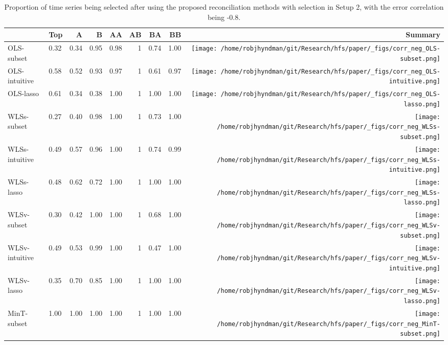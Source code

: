 \documentclass[
  12pt,
  11pt]{article}
\begin{document}
\hypertarget{tbl-corr-selection-neg}{}
\begin{table}[!h]
\caption{\label{tbl-corr-selection-neg}Proportion of time series being selected after using the proposed
reconciliation methods with selection in Setup 2, with the error
correlation being -0.8. }\tabularnewline

\centering\begingroup\fontsize{11}{13}\selectfont

\begin{threeparttable}
\begin{tabular}{llrrrrrr>{}r}
\toprule
  & Top & A & B & AA & AB & BA & BB & Summary\\
\midrule
OLS-subset & 0.32 & 0.34 & 0.95 & 0.98 & 1 & 0.74 & 1.00 & \texttt{[image: /home/robjhyndman/git/Research/hfs/paper/\_figs/corr\_neg\_OLS-subset.png]}\\
OLS-intuitive & 0.58 & 0.52 & 0.93 & 0.97 & 1 & 0.61 & 0.97 & \texttt{[image: /home/robjhyndman/git/Research/hfs/paper/\_figs/corr\_neg\_OLS-intuitive.png]}\\
OLS-lasso & 0.61 & 0.34 & 0.38 & 1.00 & 1 & 1.00 & 1.00 & \texttt{[image: /home/robjhyndman/git/Research/hfs/paper/\_figs/corr\_neg\_OLS-lasso.png]}\\
\midrule
WLSs-subset & 0.27 & 0.40 & 0.98 & 1.00 & 1 & 0.73 & 1.00 & \texttt{[image: /home/robjhyndman/git/Research/hfs/paper/\_figs/corr\_neg\_WLSs-subset.png]}\\
WLSs-intuitive & 0.49 & 0.57 & 0.96 & 1.00 & 1 & 0.74 & 0.99 & \texttt{[image: /home/robjhyndman/git/Research/hfs/paper/\_figs/corr\_neg\_WLSs-intuitive.png]}\\
WLSs-lasso & 0.48 & 0.62 & 0.72 & 1.00 & 1 & 1.00 & 1.00 & \texttt{[image: /home/robjhyndman/git/Research/hfs/paper/\_figs/corr\_neg\_WLSs-lasso.png]}\\
\midrule
WLSv-subset & 0.30 & 0.42 & 1.00 & 1.00 & 1 & 0.68 & 1.00 & \texttt{[image: /home/robjhyndman/git/Research/hfs/paper/\_figs/corr\_neg\_WLSv-subset.png]}\\
WLSv-intuitive & 0.49 & 0.53 & 0.99 & 1.00 & 1 & 0.47 & 1.00 & \texttt{[image: /home/robjhyndman/git/Research/hfs/paper/\_figs/corr\_neg\_WLSv-intuitive.png]}\\
WLSv-lasso & 0.35 & 0.70 & 0.85 & 1.00 & 1 & 1.00 & 1.00 & \texttt{[image: /home/robjhyndman/git/Research/hfs/paper/\_figs/corr\_neg\_WLSv-lasso.png]}\\
\midrule
MinT-subset & 1.00 & 1.00 & 1.00 & 1.00 & 1 & 1.00 & 1.00 & \texttt{[image: /home/robjhyndman/git/Research/hfs/paper/\_figs/corr\_neg\_MinT-subset.png]}\\

\end{tabular}
\end{threeparttable}
\end{table}
\end{document}
